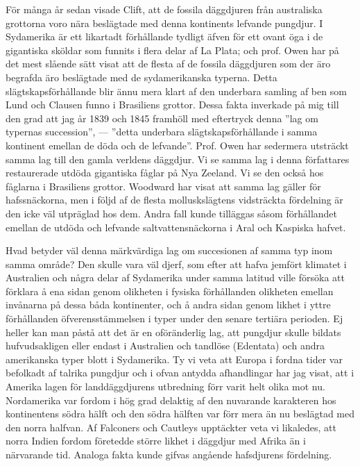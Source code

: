 För många år sedan visade Clift, att de fossila däggdjuren från australiska grottorna voro nära beslägtade med denna kontinents lefvande pungdjur. I Sydamerika är ett likartadt förhållande tydligt äfven för ett ovant öga i de gigantiska sköldar som funnits i flera delar af La Plata; och prof. Owen har på det mest slående sätt visat att de flesta af de fossila däggdjuren som der äro begrafda äro beslägtade med de sydamerikanska typerna. Detta slägtskapsförhållande blir ännu mera klart af den underbara samling af ben som Lund och Clausen funno i Brasiliens grottor. Dessa fakta inverkade på mig till den grad att jag år 1839 och 1845 framhöll med eftertryck denna ”lag om typernas succession”, — ”detta underbara slägtskapsförhållande i samma kontinent emellan de döda och de lefvande”. Prof. Owen har sedermera utsträckt samma lag till den gamla verldens däggdjur. Vi se samma lag i denna författares restaurerade utdöda gigantiska fåglar på Nya Zeeland. Vi se den också hos fåglarna i Brasiliens grottor. Woodward har visat att samma lag gäller för hafssnäckorna, men i följd af de flesta molluskslägtens vidsträckta fördelning är den icke väl utpräglad hos dem. Andra fall kunde tilläggas såsom förhållandet emellan de utdöda och lefvande saltvattensnäckorna i Aral och Kaspiska hafvet.

Hvad betyder väl denna märkvärdiga lag om succesionen af samma typ inom samma område? Den skulle vara väl djerf, som efter att hafva jemfört klimatet i Australien och några delar af Sydamerika under samma latitud ville försöka att förklara å ena sidan genom olikheten i fysiska förhållanden olikheten emellan invånarna på dessa båda kontinenter, och å andra sidan genom likhet i yttre förhållanden öfverensstämmelsen i typer under den senare tertiära perioden. Ej heller kan man påstå att det är en oföränderlig lag, att pungdjur skulle bildats hufvudsakligen eller endast i Australien och tandlöse (Edentata) och andra amerikanska typer blott i Sydamerika. Ty vi veta att Europa i fordna tider var befolkadt af talrika pungdjur och i ofvan antydda afhandlingar har jag visat, att i Amerika lagen för landdäggdjurens utbredning förr varit helt olika mot nu. Nordamerika var fordom i hög grad delaktig af den nuvarande karakteren hos kontinentens södra hälft och den södra hälften var förr mera än nu beslägtad med den norra halfvan. Af Falconers och Cautleys upptäckter veta vi likaledes, att norra Indien fordom företedde större likhet i däggdjur med Afrika än i närvarande tid. Analoga fakta kunde gifvas angående hafsdjurens fördelning.

